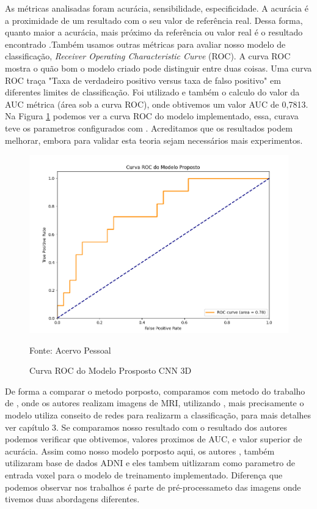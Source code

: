 \documentclass[openright]{UFRGS} %
\begin{document}
As métricas analisadas foram  acurácia, sensibilidade, especificidade. A acurácia é a proximidade de um resultado com o seu valor de referência real. Dessa forma, quanto maior a acurácia, mais próximo da referência ou valor real é o resultado encontrado \cite{monico2009acuracia}
.Também usamos outras métricas para avaliar nosso modelo de classificação, \textit{Receiver Operating Characteristic Curve} (ROC).
A curva ROC mostra o quão bom o modelo criado pode distinguir entre duas coisas.
Uma curva ROC traça "Taxa de verdadeiro positivo versus taxa de falso positivo"  em diferentes limites de classificação.
Foi utilizado e também o calculo do valor da AUC métrica (área sob a curva ROC), onde obtivemos um valor AUC de 0,7813. Na Figura  \ref{fig:rocCurve} podemos ver a curva ROC do modelo implementado, essa, curava teve os parametros configurados com .
Acreditamos que os resultados podem melhorar,
embora para validar esta teoria sejam necessários mais experimentos.



\begin{figure}[h]
    \centering
    \caption{Curva ROC do Modelo Prosposto CNN 3D}
    \includegraphics[scale=0.40]{ROCCurvemodelopro.png}
    \centerline{Fonte: Acervo Pessoal}
    \label{fig:rocCurve}
\end{figure}


De forma a comparar o metodo porposto, comparamos com metodo do trabalho de \cite{rieke2018visualizing}, onde os autores realizam  imagens de MRI, utilizando  , mais precisamente o modelo  utiliza conseito de redes  para realizarm a classificação, para mais detalhes ver capítulo 3. Se comparamos nosso resultado com o resultado dos autores podemos verificar que obtivemos, valores proximos de AUC, e valor superior de acurácia. Assim como nosso modelo porposto aqui, os autores \cite{rieke2018visualizing}, também utilizaram base de dados ADNI e eles tambem uitlizaram como parametro de entrada voxel para o modelo de treinamento implementado. Diferença que podemos observar nos trabalhos é parte de pré-processameto das imagens onde tivemos duas abordagens diferentes.
\end{document}
